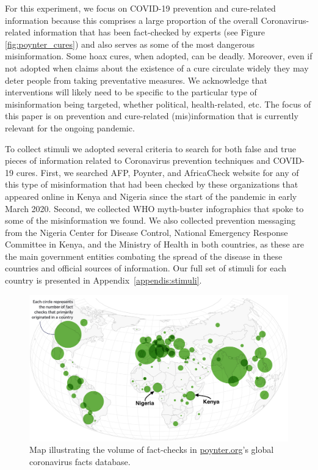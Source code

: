 \documentclass[letterpaper, 12pt, parskip=full,]{scrartcl}
\begin{document}
For this experiment, we focus on COVID-19 prevention and cure-related information because this comprises a large proportion of the overall Coronavirus-related information that has been fact-checked by experts (see Figure \ref{fig:poynter_cures}) and also serves as some of the most dangerous misinformation. Some hoax cures, when adopted, can be deadly. Moreover, even if not adopted when claims about the existence of a cure circulate widely they may deter people from taking preventative measures. We acknowledge that interventions will likely need to be specific to the particular type of misinformation being targeted, whether political, health-related, etc. The focus of this paper is on prevention and cure-related (mis)information that is currently relevant for the ongoing pandemic. 

To collect stimuli we adopted several criteria to search for both false and true pieces of information related to Coronavirus prevention techniques and COVID-19 cures. First, we searched AFP, Poynter, and AfricaCheck website for any of this type of misinformation that had been checked by these organizations that appeared online in Kenya and Nigeria since the start of the pandemic in early March 2020. Second, we collected WHO myth-buster infographics that spoke to some of the misinformation we found. We also collected prevention messaging from the Nigeria Center for Disease Control, National Emergency Response Committee in Kenya, and the Ministry of Health in both countries, as these are the main government entities combating the spread of the disease in these countries and official sources of information. Our full set of stimuli for each country is presented in Appendix~\ref{appendis:stimuli}. 


\begin{figure}[t]
\centering
\caption{Map illustrating the volume of fact-checks in \url{poynter.org}'s global coronavirus facts database.}
\label{fig:poynter}
\includegraphics[width=.95\textwidth]{poynter2.png}
\end{figure}
\end{document}
